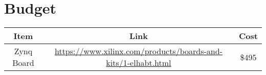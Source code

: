 \documentclass[11pt, oneside]{article}   	%
\begin{document}
\section{Budget}

\begin{center}
\begin{tabular}{ |c|c|c|}
    \hline
    \textbf{Item}           & \textbf{Link}                                                     & \textbf{Cost} \\
    \hline
    Zynq Board              & \href{https://www.xilinx.com/products/boards-and-kits/1-elhabt.html}{https://www.xilinx.com/products/boards-and-kits/1-elhabt.html}     & \$495 \\
    \hline
\end{tabular}
\end{center}

\clearpage  %
\end{document}
